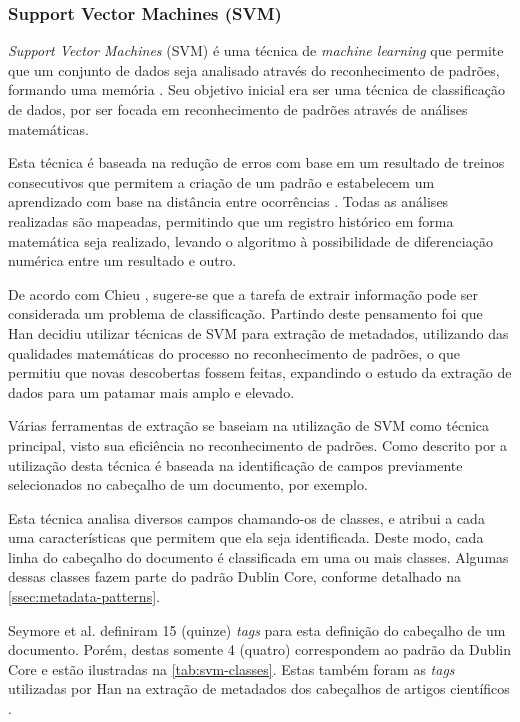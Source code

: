 \subsubsection{Support Vector Machines (SVM)}
\label{sssec:svm}

\emph{Support Vector Machines} (SVM) é uma técnica de \textit{machine learning} que permite que um conjunto de dados seja analisado através do reconhecimento de padrões, formando uma memória \cite{Vapnik-SVM}. Seu objetivo inicial era ser uma técnica de classificação de dados, por ser focada em reconhecimento de padrões através de análises matemáticas.

Esta técnica é baseada na redução de erros com base em um resultado de treinos consecutivos que permitem a criação de um padrão e estabelecem um aprendizado com base na distância entre ocorrências \cite{Vapnik-SVM}. Todas as análises realizadas são mapeadas, permitindo que um registro histórico em forma matemática seja realizado, levando o algoritmo à possibilidade de diferenciação numérica entre um resultado e outro.

De acordo com Chieu \cite{Chieu}, sugere-se que a tarefa de extrair informação pode ser considerada um problema de classificação. Partindo deste pensamento foi que Han \cite{Han-SVM} decidiu utilizar técnicas de SVM para extração de metadados, utilizando das qualidades matemáticas do processo no reconhecimento de padrões, o que permitiu que novas descobertas fossem feitas, expandindo o estudo da extração de dados para um patamar mais amplo e elevado.

Várias ferramentas de extração se baseiam na utilização de SVM como técnica principal, visto sua eficiência no reconhecimento de padrões. Como descrito por \cite{Han-SVM} a utilização desta técnica é baseada na identificação de campos previamente selecionados no cabeçalho de um documento, por exemplo.

Esta técnica analisa diversos campos chamando-os de classes, e atribui a cada uma características que permitem que ela seja identificada. Deste modo, cada linha do cabeçalho do documento é classificada em uma ou mais classes. Algumas dessas classes fazem parte do padrão Dublin Core, conforme detalhado na \autoref{ssec:metadata-patterns}.

Seymore et al. \cite{Seymore-HMM-IE} definiram 15 (quinze) \textit{tags} para esta definição do cabeçalho de um documento. Porém, destas somente 4 (quatro) correspondem ao padrão da Dublin Core e estão ilustradas na \autoref{tab:svm-classes}. Estas também foram as \textit{tags} utilizadas por Han na extração de metadados dos cabeçalhos de artigos científicos \cite{Han-SVM}.


